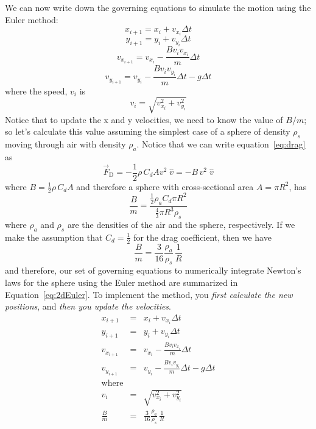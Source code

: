 We can now write down the governing equations to simulate the motion using the Euler method: 
$$ x_{i+1} = x_i + v_{x_i} \Delta t $$
$$ y_{i+1} = y_i + v_{y_i} \Delta t $$
$$ v_{x_{i+1}} = v_{x_i} - \frac{B v_i v_{x_i}}{m}\Delta t $$
$$ v_{y_{i+1}} = v_{y_i} - \frac{B v_i v_{y_i}}{m}\Delta t - g\Delta t $$
where the speed, $v_i$ is 
$$v_i = \sqrt{v^2_{x_i} + v^2_{y_i}}$$
Notice that to update the x and y velocities, we need to know the value of $B/m$; so let's calculate this value assuming the simplest case of a sphere of density $\rho_s$ moving through air with density $\rho_a$. Notice that we can write equation~\ref{eq:drag} as
\begin{equation} 
\vec{F}_{\mathrm{D}} = - \frac{1}{2}\rho \,C_d A v^2 \;\hat{v} = -B \, v^2 \;\hat{v}
\label{eq:dragModified}
\end{equation}
where $B=\frac{1}{2}\rho \,C_d A$ and therefore a sphere with cross-sectional area $A = \pi R^2$, has 
\begin{equation}
	\frac{B}{m} = \frac{\frac{1}{2}\rho_a C_d \pi R^2}{\frac{4}{3}\pi R^3 \rho_s}
\end{equation}
where $\rho_a$ and $\rho_s$ are the densities of the air and the sphere, respectively.
If we make the assumption that $C_d = \frac{1}{2}$ for the drag coefficient, then we have 
\begin{equation} 
	\frac{B}{m} = \frac{3}{16} \frac{\rho_a}{\rho_s} \, \frac{1}{R}
\end{equation}
and therefore, our set of governing equations to numerically integrate Newton's laws for the sphere using the Euler method are summarized in Equation~\ref{eq:2dEuler}. To implement the method, you \textit{first calculate the new positions}, and \textit{then you update the velocities}.
\begin{eqnarray}
 x_{i+1} & = & x_i + v_{x_i} \Delta t     \nonumber \\
 y_{i+1} & = & y_i + v_{y_i} \Delta t  \nonumber \\
 v_{x_{i+1}} & = & v_{x_i} - \frac{B v_i v_{x_i}}{m}\Delta t \nonumber \\
 v_{y_{i+1}} & = & v_{y_i} - \frac{B v_i v_{y_i}}{m}\Delta t - g\Delta t \nonumber \\[4mm]
 \mathrm{where} & &\nonumber \\[4mm]
 v_i &  = & \sqrt{v^2_{x_i} + v^2_{y_i}} \nonumber \\[4mm]
 \frac{B}{m} & = & \frac{3}{16} \frac{\rho_a}{\rho_s} \, \frac{1}{R} \nonumber \\
 \label{eq:2dEuler}
 \end{eqnarray}
 

